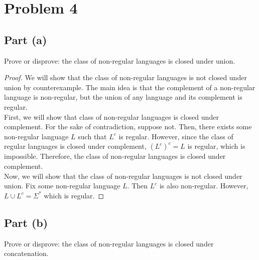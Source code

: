 \documentclass{article}
\begin{document}
\section*{Problem 4}

\subsection*{Part (a)}

Prove or disprove: the class of non-regular languages is closed under union.

\begin{proof}
    We will show that the class of non-regular languages is not closed under union by counterexample. The main idea is that the complement of a non-regular 
    language is non-regular, but the union of any language and its complement is regular. \\

    \noindent
    First, we will show that class of non-regular languages is closed under complement. For the sake of contradiction, suppose not. Then, there exists some 
    non-regular language $L$ such that $L^c$ is regular. However, since the class of regular languages is closed under complement, $(L^c)^c = L$ is regular, 
    which is impossible. Therefore, the class of non-regular languages is closed under complement. \\

    \noindent
    Now, we will show that the class of non-regular languages is not closed under union. Fix some non-regular language $L$. Then $L^c$ is also non-regular.
    However, $L \cup L^c = \Sigma^*$ which is regular.
\end{proof}

\subsection*{Part (b)}

Prove or disprove: the class of non-regular languages is closed under concatenation.
\end{document}

